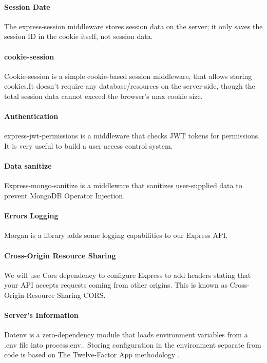 \paragraph*{Session Date}
The express-session middleware stores session data on the server; it only saves the session ID in the cookie itself, not session data.

\paragraph*{cookie-session}
Cookie-session is a simple cookie-based session middleware, that allows storing cookies.It doesn't require any database/resources on the server-side, though the total session data cannot exceed the browser’s max cookie size.

\paragraph*{Authentication}
express-jwt-permissions is a middleware that checks \ac{JWT} tokens for permissions. It is very useful to build a user access control system.

\paragraph*{Data sanitize}
Express-mongo-sanitize is a middleware that sanitizes user-supplied data to prevent MongoDB Operator Injection.

\paragraph*{Errors Logging}
Morgan is a library adds some logging capabilities to our Express API.

\paragraph*{Cross-Origin Resource Sharing}
We will use Cors dependency to configure Express to add headers stating that your API accepts requests coming from other origins. This is known as Cross-Origin Resource Sharing \ac{CORS}.
\paragraph*{Server's Information}
Dotenv is a zero-dependency module that loads environment variables from a .env file into process.env.. Storing configuration in the environment separate from code is based on The Twelve-Factor App methodology \cite{web004}.





